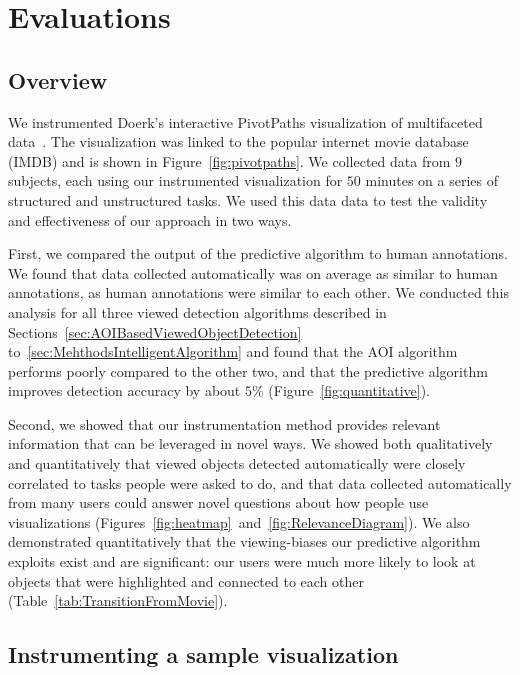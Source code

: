 \section{Evaluations}
\label{sec:DOICollectionEvaluation}

\subsection{Overview}
We instrumented Doerk's interactive PivotPaths visualization of multifaceted data~\cite{Dor12}. The visualization was linked to the popular internet movie database (IMDB) and is shown in Figure~\ref{fig:pivotpaths}. We collected data from $9$ subjects, each using our instrumented visualization for $50$ minutes on a series of structured and unstructured tasks. We used this data data to test the validity and effectiveness of our approach in two ways. 

First, we compared the output of the predictive algorithm to human annotations. We found that data collected automatically was on average as similar to human annotations, as human annotations were similar to each other. We conducted this analysis for all three viewed detection algorithms described in Sections~\ref{sec:AOIBasedViewedObjectDetection} to~\ref{sec:MehthodsIntelligentAlgorithm} and found that the AOI algorithm performs poorly compared to the other two, and that the predictive algorithm improves detection accuracy by about $5\%$  (Figure~\ref{fig:quantitative}). 

Second, we showed that our instrumentation method provides relevant information that can be leveraged in novel ways. We showed both qualitatively and quantitatively that viewed objects detected automatically were closely correlated to tasks people were asked to do, and that data collected automatically from many users could answer novel questions about how people use visualizations (Figures~\ref{fig:heatmap}~and~\ref{fig:RelevanceDiagram}).    We also demonstrated quantitatively that the viewing-biases our predictive algorithm exploits exist and are significant: our users were much more likely to look at objects that were highlighted and connected to each other (Table~\ref{tab:TransitionFromMovie}).


\subsection{Instrumenting a sample visualization}
\label{sec:InstrumentingVisualization}

